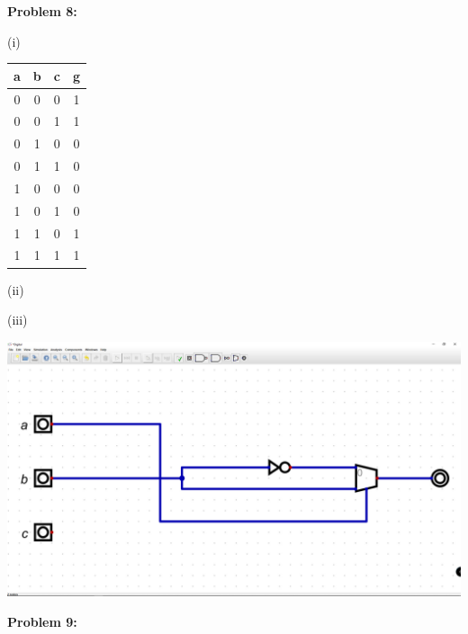 \documentclass{article}
\begin{document}

    \textbf{Problem 8:}

    \quad\quad (i)

    \begin{center}
        \begin{tabular} {ccc|c}
            a & b & c & g \\
            \hline
            0 & 0 & 0 & 1 \\
            0 & 0 & 1 & 1 \\
            0 & 1 & 0 & 0 \\
            0 & 1 & 1 & 0 \\
            1 & 0 & 0 & 0 \\
            1 & 0 & 1 & 0 \\
            1 & 1 & 0 & 1 \\
            1 & 1 & 1 & 1 \\
        \end{tabular}
    \end{center}

    \quad\quad (ii)

    \quad\quad\quad\quad{}

    \quad\quad (iii)

    \begin{center}
        \includegraphics[width=\linewidth]{HW3_q8.jpg}
    \end{center}


    \textbf{Problem 9:}
\end{document}
